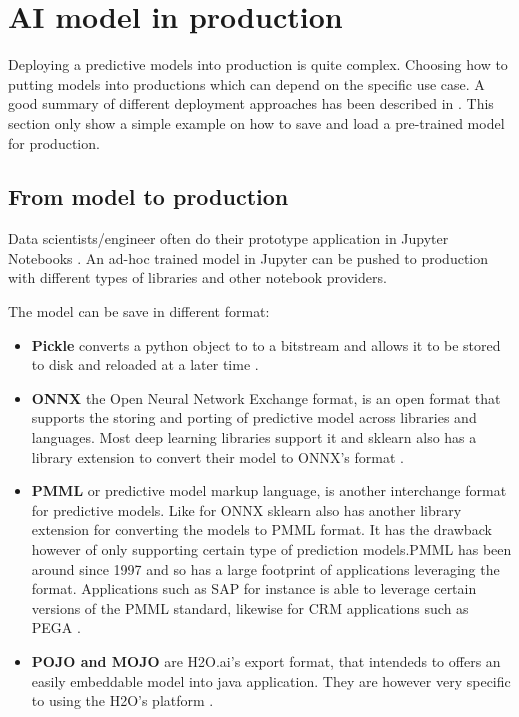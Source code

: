 \section{AI model in production}

Deploying a predictive models into production is quite complex. Choosing how to putting models into productions which can depend on the specific use case. A good summary of different deployment approaches has been described in \cite{deploying-ML}. This section only show a simple example on how to save and load a pre-trained model for production.  

\subsection{From model to production}

Data scientists/engineer often do their prototype application in Jupyter Notebooks \cite{Jupyter-Notebooks}.
An ad-hoc trained model in Jupyter can be pushed to production with different types of libraries and other notebook providers. 

The model can be save in different format:

\begin{itemize}
    \item \textbf{Pickle} converts a python object to to a bitstream and allows it to be stored to disk and reloaded at a later time \cite{ML_Apporaches}.
    \item \textbf{ONNX} the Open Neural Network Exchange format, is an open format that supports the storing and porting of predictive model across libraries and languages. Most deep learning libraries support it and sklearn \cite{scikit-learn} also has a library extension to convert their model to ONNX’s format \cite{ML_Apporaches}.
    \item \textbf{PMML} or predictive model markup language, is another interchange format for predictive models. Like for ONNX sklearn also has another library extension for converting the models to PMML format. It has the drawback however of only supporting certain type of prediction models.PMML has been around since 1997 and so has a large footprint of applications leveraging the format. Applications such as SAP for instance is able to leverage certain versions of the PMML standard, likewise for CRM applications such as PEGA \cite{ML_Apporaches}.
    \item \textbf{POJO and MOJO} are H2O.ai’s export format, that intendeds to offers an easily embeddable model into java application. They are however very specific to using the H2O’s platform \cite{ML_Apporaches}.
\end{itemize}

